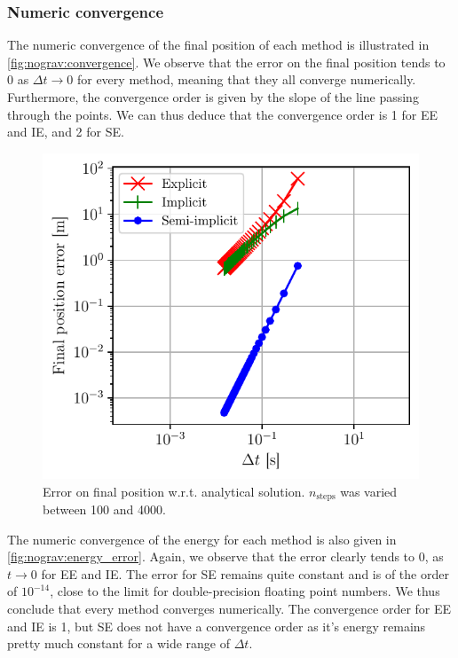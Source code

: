 \subsubsection{Numeric convergence}

The numeric convergence of the final position of each method is illustrated in \autoref{fig:nograv:convergence}. We observe that the error on the final position tends to 0 as $\Delta t \rightarrow 0$ for every method, meaning that they all converge numerically. Furthermore, the convergence order is given by the slope of the line passing through the points. We can thus deduce that the convergence order is 1 for EE and IE, and 2 for SE.

\begin{figure}[h]
    \centering
    \includegraphics[width=0.8\linewidth]{figures/nograv_numeric_convergence_all.pdf}
    \caption{Error on final position w.r.t. analytical solution. $n_\textrm{steps}$ was varied between 100 and 4000.}
    \label{fig:nograv:convergence}
\end{figure}

The numeric convergence of the energy for each method is also given in \autoref{fig:nograv:energy_error}. Again, we observe that the error clearly tends to 0, as $t \rightarrow 0$ for EE and IE. The error for SE remains quite constant and is of the order of $10^{-14}$, close to the limit for double-precision floating point numbers. We thus conclude that every method converges numerically. The convergence order for EE and IE is 1, but SE does not have a convergence order as it's energy remains pretty much constant for a wide range of $\Delta t$.

